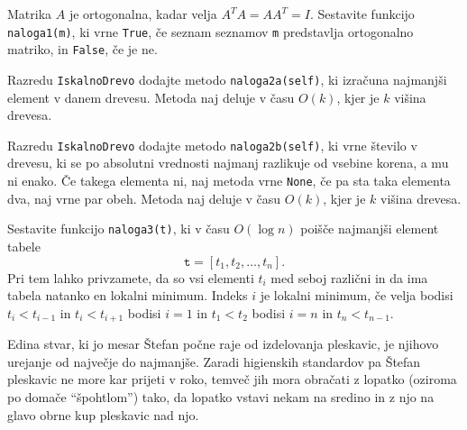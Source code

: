 \documentclass[arhiv]{izpit}
\begin{document}

\naloga[25 točk]

Matrika $A$ je ortogonalna, kadar velja $A^T A = A A^T = I$.
Sestavite funkcijo \verb|naloga1(m)|, ki vrne
  \verb|True|, če seznam seznamov \verb|m| predstavlja ortogonalno matriko, in
  \verb|False|, če je ne.


\naloga[25 točk]

\podnaloga[10 točk]
  Razredu \verb|IskalnoDrevo| dodajte metodo \verb|naloga2a(self)|,
  ki izračuna najmanjši element v danem drevesu.
  Metoda naj deluje v času $O(k)$, kjer je $k$ višina drevesa.

\podnaloga[15 točk]
  Razredu \verb|IskalnoDrevo| dodajte metodo \verb|naloga2b(self)|, ki vrne število v drevesu, ki se po absolutni vrednosti najmanj razlikuje od vsebine korena, a mu ni enako. Če takega elementa ni, naj metoda vrne \verb|None|, če pa sta taka elementa dva, naj vrne par obeh. Metoda naj deluje v času $O(k)$, kjer je $k$ višina drevesa.

\naloga[25 točk]

Sestavite funkcijo \verb|naloga3(t)|,
ki v času $O(\log n)$ poišče najmanjši element tabele
\[
  \mathtt{t} = [t_1, t_2, \dots, t_n].
\]
Pri tem lahko privzamete, da so vsi elementi $t_i$ med seboj različni
in da ima tabela natanko en lokalni minimum.
Indeks $i$ je lokalni minimum, če velja bodisi
  $t_i < t_{i - 1}$ in $t_i < t_{i + 1}$
  bodisi $i = 1$ in $t_1 < t_2$
  bodisi $i = n$ in $t_n < t_{n - 1}$.

\naloga[25+ točk]

Edina stvar,
ki jo mesar Štefan počne raje od izdelovanja pleskavic,
je njihovo urejanje od največje do najmanjše.
Zaradi higienskih standardov
pa Štefan pleskavic ne more kar prijeti v roko,
temveč jih mora obračati z lopatko (oziroma po domače ``špohtlom'') tako,
da lopatko vstavi nekam na sredino in
z njo na glavo obrne kup pleskavic nad njo.
\end{document}
